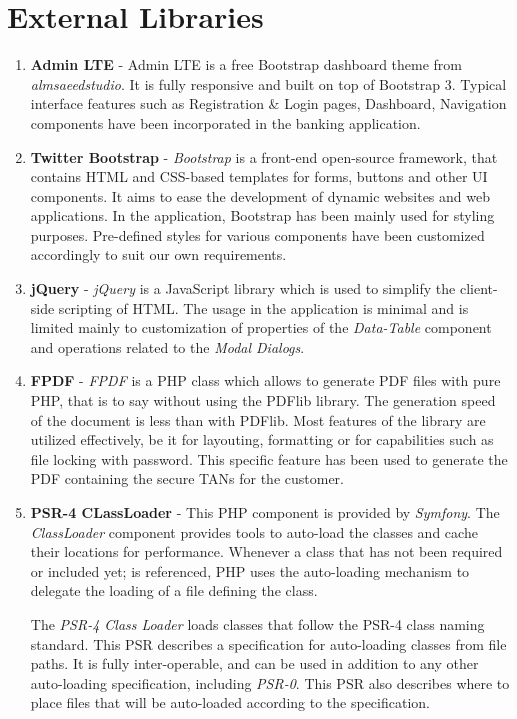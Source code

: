 \section{External Libraries} \label{section_libraries}

\begin{enumerate}
\item \textbf{Admin LTE} - Admin LTE is a free Bootstrap dashboard theme from \textit{almsaeedstudio}. It is fully responsive and built on top of Bootstrap 3. Typical interface features such as Registration \& Login pages, Dashboard, Navigation components have been incorporated in the banking application.  

\item \textbf{Twitter Bootstrap} - \textit{Bootstrap} is a front-end open-source framework, that contains HTML and CSS-based templates for forms, buttons and other UI components. It aims to ease the development of dynamic websites and web applications. In the application, Bootstrap has been mainly used for styling purposes. Pre-defined styles for various components have been customized accordingly to suit our own requirements.

\item \textbf{jQuery} - \textit{jQuery} is a JavaScript library which is used to simplify the client-side scripting of HTML. The usage in the application is minimal and is limited mainly to customization of properties of the \textit{Data-Table} component and operations related to the \textit{Modal Dialogs}.

\item \textbf{FPDF} - \textit{FPDF} is a PHP class which allows to generate PDF files with pure PHP, that is to say without using the PDFlib library. The generation speed of the document is less than with PDFlib. Most features of the library are utilized effectively, be it for layouting, formatting or for capabilities such as file locking with password. This specific feature has been used to generate the PDF containing the secure TANs for the customer.

\item \textbf{PSR-4 CLassLoader} - This PHP component is provided by \textit{Symfony}. The \textit{ClassLoader} component provides tools to auto-load the classes and cache their locations for performance. Whenever a class that has not been required or included yet; is referenced, PHP uses the auto-loading mechanism to delegate the loading of a file defining the class.

The \textit{PSR-4 Class Loader}  loads classes that follow the PSR-4 class naming standard. 
This PSR describes a specification for auto-loading classes from file paths. It is fully inter-operable, and can be used in addition to any other auto-loading specification, including \textit{PSR-0}. This PSR also describes where to place files that will be auto-loaded according to the specification.

\end{enumerate}

\clearpage